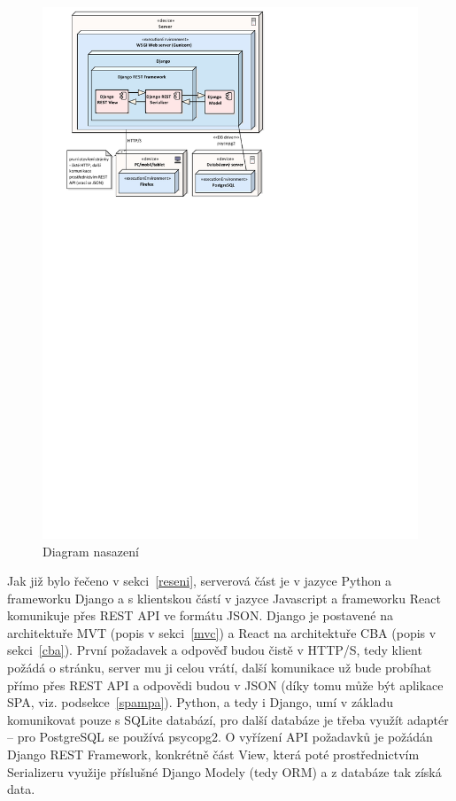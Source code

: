     \begin{figure}[ht]\centering
    	\includegraphics[width=1\textwidth]{img/deployment-diagram}
    	\caption[Diagram nasazení]{Diagram nasazení}\label{fig:deployment-diagram}
    \end{figure}
    
    Jak již bylo řečeno v sekci~\ref{reseni}, serverová část je v jazyce Python a frameworku Django a s klientskou částí v jazyce Javascript a frameworku React komunikuje přes REST API ve formátu JSON. Django je postavené na architektuře MVT (popis v sekci~\ref{mvc}) a React na architektuře CBA (popis v sekci~\ref{cba}). První požadavek a odpověď budou čistě v HTTP/S, tedy klient požádá o stránku, server mu ji celou vrátí, další komunikace už bude probíhat přímo přes REST API a odpovědi budou v JSON (díky tomu může být aplikace SPA, viz. podsekce~\ref{spampa}). Python, a tedy i Django, umí v základu komunikovat pouze s SQLite databází, pro další databáze je třeba využít adaptér -- pro PostgreSQL se používá psycopg2. O vyřízení API požadavků je požádán Django REST Framework, konkrétně část View, která poté prostřednictvím Serializeru využije příslušné Django Modely (tedy ORM) a z databáze tak získá data.
    
